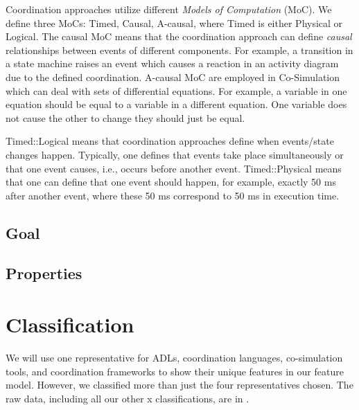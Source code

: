 \documentclass[runningheads]{llncs}
\begin{document}
Coordination approaches utilize different \textit{Models of Computation} (MoC).
We define three MoCs: \textsf{Timed}, \textsf{Causal}, \textsf{A-causal}, where \textsf{Timed} is either \textsf{Physical} or \textsf{Logical}.
The causal MoC means that the coordination approach can define \textit{causal} relationships between events of different components.
For example, a transition in a state machine raises an event which causes a reaction in an activity diagram due to the defined coordination.
A-causal MoC are employed in Co-Simulation which can deal with sets of differential equations.
For example, a variable in  one equation should be equal to a variable in a different equation.
One variable does not cause the other to change they should just be equal.

\textsf{Timed::Logical} means that coordination approaches define when events/state changes happen.
Typically, one defines that events take place simultaneously or that one event causes, i.e., occurs before another event.
\textsf{Timed::Physical} means that one can define that one event should happen, for example, exactly 50 ms after another event, where these 50 ms correspond to 50 ms in execution time.



\subsection{Goal}
\subsection{Properties}

\section{Classification} \label{sec:classifications}
We will use one representative for ADLs, coordination languages, co-simulation tools, and coordination frameworks to show their unique features in our feature model.
However, we classified more than just the four representatives chosen.
The raw data, including all our other x classifications, are in \cite{anonymousauthorsCoordination2024Artifacts2024}.
\end{document}
